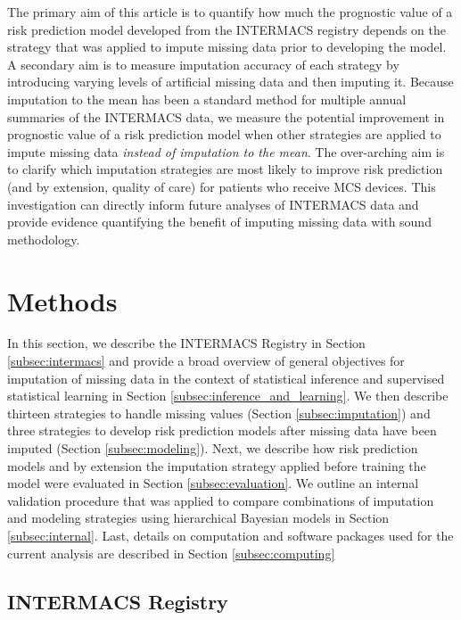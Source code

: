 \documentclass{article}
\begin{document}
The primary aim of this article is to quantify how much the prognostic
value of a risk prediction model developed from the INTERMACS registry
depends on the strategy that was applied to impute missing data prior to
developing the model. A secondary aim is to measure imputation accuracy
of each strategy by introducing varying levels of artificial missing
data and then imputing it. Because imputation to the mean has been a
standard method for multiple annual summaries of the INTERMACS data, we
measure the potential improvement in prognostic value of a risk
prediction model when other strategies are applied to impute missing
data \emph{instead of imputation to the mean}. The over-arching aim is
to clarify which imputation strategies are most likely to improve risk
prediction (and by extension, quality of care) for patients who receive
MCS devices. This investigation can directly inform future analyses of
INTERMACS data and provide evidence quantifying the benefit of imputing
missing data with sound methodology.

\hypertarget{methods}{%
\section{Methods}\label{methods}}

\label{sec:methods}

In this section, we describe the INTERMACS Registry in Section
\ref{subsec:intermacs} and provide a broad overview of general
objectives for imputation of missing data in the context of statistical
inference and supervised statistical learning in Section
\ref{subsec:inference_and_learning}. We then describe thirteen
strategies to handle missing values (Section \ref{subsec:imputation})
and three strategies to develop risk prediction models after missing
data have been imputed (Section \ref{subsec:modeling}). Next, we
describe how risk prediction models and by extension the imputation
strategy applied before training the model were evaluated in Section
\ref{subsec:evaluation}. We outline an internal validation procedure
that was applied to compare combinations of imputation and modeling
strategies using hierarchical Bayesian models in Section
\ref{subsec:internal}. Last, details on computation and software
packages used for the current analysis are described in Section
\ref{subsec:computing}

\hypertarget{intermacs-registry}{%
\subsection{INTERMACS Registry}\label{intermacs-registry}}
\end{document}
